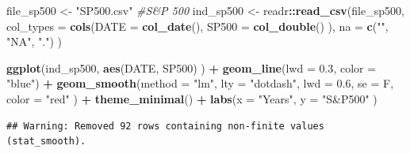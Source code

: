 \documentclass[11pt,]{article}
\newenvironment{Shaded}{\begin{snugshade}}{\end{snugshade}}
\newcommand{\KeywordTok}[1]{\textcolor[rgb]{0.13,0.29,0.53}{\textbf{#1}}}
\newcommand{\DataTypeTok}[1]{\textcolor[rgb]{0.13,0.29,0.53}{#1}}
\newcommand{\FloatTok}[1]{\textcolor[rgb]{0.00,0.00,0.81}{#1}}
\newcommand{\StringTok}[1]{\textcolor[rgb]{0.31,0.60,0.02}{#1}}
\newcommand{\CommentTok}[1]{\textcolor[rgb]{0.56,0.35,0.01}{\textit{#1}}}
\newcommand{\OperatorTok}[1]{\textcolor[rgb]{0.81,0.36,0.00}{\textbf{#1}}}
\newcommand{\NormalTok}[1]{#1}
\begin{document}
\begin{Shaded}
\begin{Highlighting}[]
\NormalTok{file_sp500 <-}\StringTok{ "SP500.csv"} \CommentTok{#S&P 500}
\NormalTok{ind_sp500 <-}\StringTok{ }\NormalTok{readr}\OperatorTok{::}\KeywordTok{read_csv}\NormalTok{(file_sp500, }
                             \DataTypeTok{col_types =} \KeywordTok{cols}\NormalTok{(}\DataTypeTok{DATE =} \KeywordTok{col_date}\NormalTok{(), }
                                              \DataTypeTok{SP500 =} \KeywordTok{col_double}\NormalTok{()}
\NormalTok{                                              ),}
                             \DataTypeTok{na =} \KeywordTok{c}\NormalTok{(}\StringTok{""}\NormalTok{, }\StringTok{"NA"}\NormalTok{, }\StringTok{"."}\NormalTok{)}
\NormalTok{                             )}

\KeywordTok{ggplot}\NormalTok{(ind_sp500, }
       \KeywordTok{aes}\NormalTok{(DATE, SP500)}
\NormalTok{       ) }\OperatorTok{+}
\StringTok{  }\KeywordTok{geom_line}\NormalTok{(}\DataTypeTok{lwd =} \FloatTok{0.3}\NormalTok{,}
            \DataTypeTok{color =} \StringTok{"blue"}\NormalTok{) }\OperatorTok{+}
\StringTok{  }\KeywordTok{geom_smooth}\NormalTok{(}\DataTypeTok{method =} \StringTok{"lm"}\NormalTok{,}
              \DataTypeTok{lty =} \StringTok{"dotdash"}\NormalTok{,}
              \DataTypeTok{lwd =} \FloatTok{0.6}\NormalTok{,}
              \DataTypeTok{se =}\NormalTok{ F,}
              \DataTypeTok{color =} \StringTok{"red"}
\NormalTok{              ) }\OperatorTok{+}
\StringTok{  }\KeywordTok{theme_minimal}\NormalTok{() }\OperatorTok{+}
\StringTok{  }\KeywordTok{labs}\NormalTok{(}\DataTypeTok{x =} \StringTok{"Years"}\NormalTok{,}
       \DataTypeTok{y =} \StringTok{"S&P500"}
\NormalTok{       )}
\end{Highlighting}
\end{Shaded}

\begin{verbatim}
## Warning: Removed 92 rows containing non-finite values (stat_smooth).
\end{verbatim}
\end{document}
